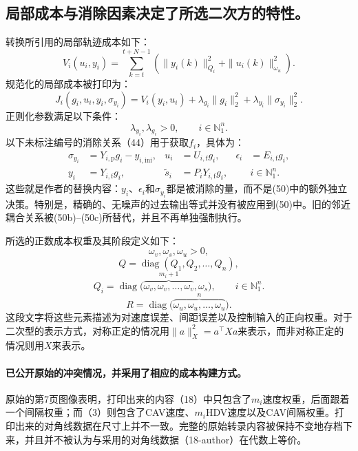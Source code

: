 \documentclass{article}
\begin{document}
\subsection*{局部成本与消除因素决定了所选二次方的特性。}
转换所引用的局部轨迹成本如下：
\begin{equation}
V_i(u_i,y_i)=\sum_{k=t}^{t+N-1}
\left(\|y_i(k)\|_{Q_i}^2+\|u_i(k)\|_{\omega_u}^2\right).
\tag{28}
\end{equation}
规范化的局部成本被打印为：
\begin{equation}
J_i(g_i,u_i,y_i,\sigma_{y_i})
=V_i(y_i,u_i)+\lambda_{g_i}\|g_i\|_2^2
 +\lambda_{y_i}\|\sigma_{y_i}\|_2^2. \tag{35}
\end{equation}
正则化参数满足以下条件：
\[
\lambda_{y_i},\lambda_{g_i}>0,\qquad i\in\mathbb N_1^n.
\]
以下未标注编号的消除关系（44）用于获取$f_i$，具体为：
\begin{align*}
\sigma_{y_i}&=Y_{i,\mathrm p}g_i-y_{i,\mathrm{ini}},&
u_i&=U_{i,\mathrm f}g_i,&
\epsilon_i&=E_{i,\mathrm f}g_i,\\
y_i&=Y_{i,\mathrm f}g_i,&
\tilde{s}_i&=P_iY_{i,\mathrm f}g_i,
&&i\in\mathbb N_1^n.
\end{align*}
这些就是作者的替换内容：$y_i$、$\epsilon_i$和$\sigma_{y_i}$都是被消除的量，而不是(50)中的额外独立决策。特别是，精确的、无噪声的过去输出等式并没有被应用到(50)中。旧的邻近耦合关系被(50b)--(50c)所替代，并且不再单独强制执行。

所选的正数成本权重及其阶段定义如下：
\[
\omega_v,\omega_s,\omega_u>0,
\]
\begin{equation}
Q=\operatorname{diag}(Q_1,Q_2,\ldots,Q_n), \tag{17}
\end{equation}
\begin{equation}
Q_i=\operatorname{diag}\bigl(
\overbrace{\omega_v,\omega_v,\ldots,\omega_v}^{m_i+1},\omega_s
\bigr),\qquad i\in\mathbb N_1^n. \tag{18-author}
\end{equation}
\begin{equation}
R=\operatorname{diag}\bigl(
\overbrace{\omega_u,\omega_u,\ldots,\omega_u}^{n}
\bigr). \tag{19}
\end{equation}
这段文字将这些元素描述为对速度误差、间距误差以及控制输入的正向权重。对于二次型的表示方式，对称正定的情况用$\|a\|_X^2=a^\top Xa$来表示，而非对称正定的情况则用$X$来表示。

\paragraph{已公开原始的冲突情况，并采用了相应的成本构建方式。}
原始的第7页图像表明，打印出来的内容（18）中只包含了$m_i$速度权重，后面跟着一个间隔权重；而（3）则包含了CAV速度、$m_i$HDV速度以及CAV间隔权重。打印出来的对角线数据在尺寸上并不一致。完整的原始转录内容被保持不变地存档下来，并且并不被认为与采用的对角线数据（18-author）在代数上等价。
\end{document}
